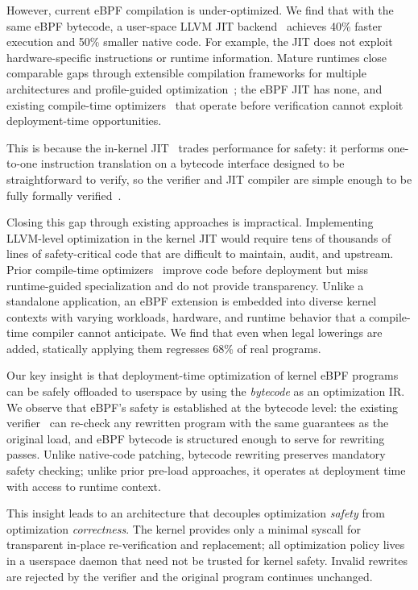 However, current eBPF compilation is under-optimized. We find that with the same eBPF bytecode, a user-space LLVM JIT backend~\cite{llvm_bpf_jit} achieves 40\% faster execution and 50\% smaller native code.
For example, the JIT does not exploit hardware-specific instructions or runtime information. Mature runtimes close comparable gaps through extensible compilation frameworks for multiple architectures and profile-guided optimization~\cite{jvm_hotspot,v8_turbofan,llvm}; the eBPF JIT has none, and existing compile-time optimizers~\cite{k2,merlin,epso} that operate before verification cannot exploit deployment-time opportunities.

This is because the in-kernel JIT~\cite{linux_bpf_jit} trades performance for safety: it performs one-to-one instruction translation on a bytecode interface designed to be straightforward to verify, so the verifier and JIT compiler are simple enough to be fully formally verified~\cite{verifyebpfverifier, jitterbug}.

Closing this gap through existing approaches is impractical. Implementing LLVM-level optimization in the kernel JIT would require tens of thousands of lines of safety-critical code that are difficult to maintain, audit, and upstream. Prior compile-time optimizers~\cite{k2,kfuse,merlin,epso} improve code before deployment but miss runtime-guided specialization and do not provide transparency.
Unlike a standalone application, an eBPF extension is embedded into diverse kernel contexts with varying workloads, hardware, and runtime behavior that a compile-time compiler cannot anticipate. We find that even when legal lowerings are added, statically applying them regresses 68\% of real programs.

Our key insight is that deployment-time optimization of kernel eBPF programs can be safely offloaded to userspace by using the \emph{bytecode} as an optimization IR. We observe that eBPF's safety is established at the bytecode level: the existing verifier~\cite{verifier} can re-check any rewritten program with the same guarantees as the original load, and eBPF bytecode is structured enough to serve for rewriting passes.
Unlike native-code patching, bytecode rewriting preserves mandatory safety checking; unlike prior pre-load approaches, it operates at deployment time with access to runtime context.

This insight leads to an architecture that decouples optimization \emph{safety} from optimization \emph{correctness}. The kernel provides only a minimal syscall for transparent in-place re-verification and replacement; all optimization policy lives in a userspace daemon that need not be trusted for kernel safety. Invalid rewrites are rejected by the verifier and the original program continues unchanged.

